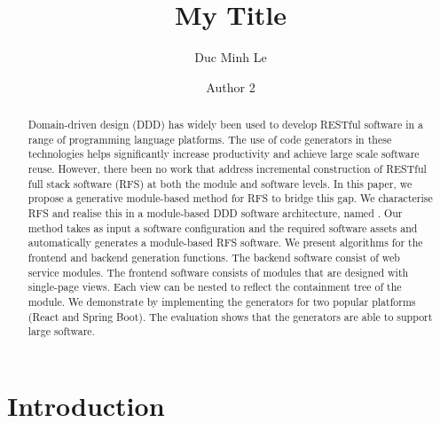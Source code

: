 \documentclass[runningheads]{llncs}
\def\titlefont{\fontsize{12pt}{14.4pt}\selectfont}
\begin{document}
\title{\titlefont My Title}

\author{Duc Minh Le \and
Author 2}
%
%

\maketitle

\begin{abstract}
Domain-driven design (DDD) has widely been used to develop RESTful software in a range of programming language platforms. The use of code generators in these technologies helps significantly increase productivity and achieve large scale software reuse.
However, there been no work that address incremental construction of RESTful full stack software (RFS) at both the module and software levels.
In this paper, we propose a generative module-based method for RFS to bridge this gap.
We characterise RFS and realise this in a module-based DDD software architecture, named \mosar. Our method takes as input a software configuration and the required software assets and automatically generates a module-based RFS software. We present algorithms for the frontend and backend generation functions. The backend software consist of web service modules. The frontend software consists of modules that are designed with single-page views. Each view can be nested to reflect the containment tree of the module.
We demonstrate by implementing the generators for two popular platforms (React and Spring Boot). The evaluation shows that the generators are able to support large software.

\end{abstract}


\section{Introduction} \label{sect:intro}
\end{document}
